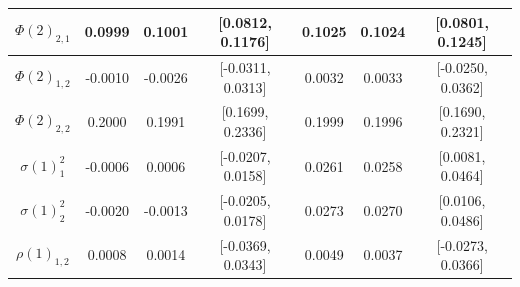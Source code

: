 \documentclass[11pt]{article}
\begin{document}
\begin{landscape}
\begin{table}
\begin{tabular}{|c | c c c | c c c |}
\hline                                                                                                                                                                                                       
$\Phi(2)_{2,1}$ & 0.0999 & 0.1001 & [0.0812, 0.1176] & 0.1025 & 0.1024 & [0.0801, 0.1245] \\                                                                                                                   
\hline                                                                                                                                                                                                       
$\Phi(2)_{1,2}$ & -0.0010 & -0.0026 & [-0.0311, 0.0313] & 0.0032 & 0.0033 & [-0.0250, 0.0362] \\                                                                                                               
\hline                                                                                                                                                                                                       
$\Phi(2)_{2,2}$ & 0.2000 & 0.1991 & [0.1699, 0.2336] & 0.1999 & 0.1996 & [0.1690, 0.2321] \\                                                                                                                   
\hline                                                                                                                                                                                                       
$\sigma(1)^2_1$ & -0.0006 & 0.0006 & [-0.0207, 0.0158] & 0.0261 & 0.0258 & [0.0081, 0.0464] \\                                                                                                                 
\hline                                                                                                                                                                                                       
$\sigma(1)^2_2$ & -0.0020 & -0.0013 & [-0.0205, 0.0178] & 0.0273 & 0.0270 & [0.0106, 0.0486] \\                                                                                                                
\hline                                                                                                                                                                                                       
$\rho(1)_{1,2}$ & 0.0008 & 0.0014 & [-0.0369, 0.0343] & 0.0049 & 0.0037 & [-0.0273, 0.0366] \\                                                                                                                 

\end{tabular}
\end{table}
\end{landscape}
\end{document}
